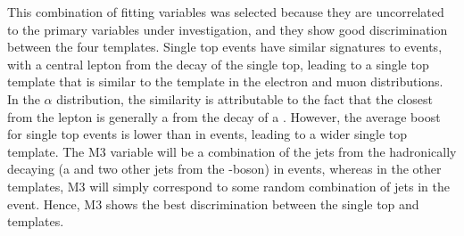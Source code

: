This combination of fitting variables was selected because they are uncorrelated to the primary variables
under investigation, and they show good discrimination between the four templates.
Single top events have similar signatures to \ttbar events, with a central lepton from the decay of the single
top, leading to a single top template that is similar to the \ttbar template in the electron \abseta and muon
\abseta distributions. In the $\alpha$ distribution, the similarity is attributable to the fact that the
closest \bjet from the lepton is generally a \bjet from the decay of a \tquark. However, the average boost for
single top events is lower than in \ttbar events, leading to a wider single top template.
The M3 variable will be a combination of the jets from the hadronically decaying \tquark (a \bjet and two
other jets from the \W-boson) in \ttbar events, whereas in the other templates, M3 will simply correspond to
some random combination of jets in the event. Hence, M3 shows the best discrimination between the single top
and \ttbar templates.

